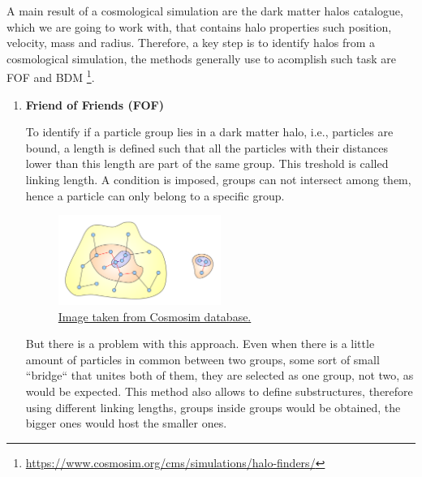 A main result of a cosmological simulation are the dark matter halos 
catalogue, which we are going to work with, that contains halo properties such
position, velocity, mass and radius. Therefore, a key step is to identify 
halos from a cosmological simulation, the methods generally use to acomplish such 
task are FOF and BDM \footnote{\url{https://www.cosmosim.org/cms/simulations/halo-finders/}}.

\begin{enumerate}


\item \textbf{Friend of Friends (FOF)} 

To identify if a particle group lies in a dark matter halo, i.e., particles 
are bound, a length is defined such that all the particles with their distances 
lower than this length are part of the same group. This treshold is called linking length. 
A condition is imposed, groups can not intersect among them, hence a particle can only belong 
to a specific group. 

\begin{figure}[htbp]
       \centering
               \includegraphics[width=0.5\textwidth]{Images/chapter3/FOFgroups.png}
       \caption{\small  \href{https://www.cosmosim.org/}{Image taken from Cosmosim database.} }
       \label{tree}
 \end{figure}


But there is a problem with this approach. Even when there is 
a little amount of particles in common between two groups, some sort of small 
``bridge`` that unites both of them, they are selected as one group, not two,
as would be expected. This method also allows to define substructures, therefore using
different linking lengths, groups inside groups would be obtained, the bigger ones
would host the smaller ones. 


\end{enumerate}
